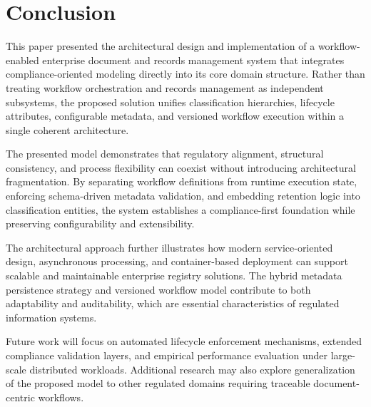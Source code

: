 ﻿%
\section{Conclusion}

This paper presented the architectural design and implementation of a workflow-enabled enterprise document and records management system that integrates compliance-oriented modeling directly into its core domain structure. 
Rather than treating workflow orchestration and records management as independent subsystems, the proposed solution unifies classification hierarchies, lifecycle attributes, configurable metadata, and versioned workflow execution within a single coherent architecture.

The presented model demonstrates that regulatory alignment, structural consistency, and process flexibility can coexist without introducing architectural fragmentation. 
By separating workflow definitions from runtime execution state, enforcing schema-driven metadata validation, and embedding retention logic into classification entities, the system establishes a compliance-first foundation while preserving configurability and extensibility.

The architectural approach further illustrates how modern service-oriented design, asynchronous processing, and container-based deployment can support scalable and maintainable enterprise registry solutions. 
The hybrid metadata persistence strategy and versioned workflow model contribute to both adaptability and auditability, which are essential characteristics of regulated information systems.

Future work will focus on automated lifecycle enforcement mechanisms, extended compliance validation layers, and empirical performance evaluation under large-scale distributed workloads. 
Additional research may also explore generalization of the proposed model to other regulated domains requiring traceable document-centric workflows.
